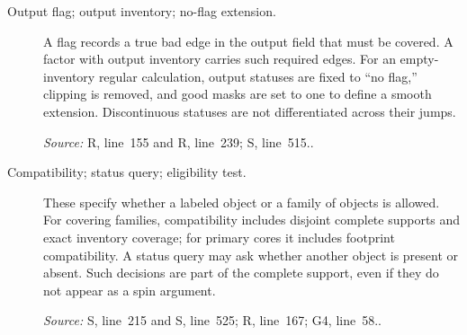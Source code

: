 \documentclass[11pt]{article}
\newcommand{\src}[2]{\textsf{#1}, line~#2}
\newcommand{\where}[1]{\par{\small\textit{Source:} #1.}}
\begin{document}
\begin{description}
\item[Output flag; output inventory; no-flag extension.]
A flag records a true bad edge in the output field that must be
covered.  A factor with output inventory carries such required edges.
For an empty-inventory regular calculation, output statuses are fixed
to ``no flag,'' clipping is removed, and good masks are set to one
to define a smooth extension.  Discontinuous statuses are not
differentiated across their jumps.
\where{\src{R}{155} and \src{R}{239}; \src{S}{515}.}

\item[Compatibility; status query; eligibility test.]
These specify whether a labeled object or a family of objects is
allowed.  For covering families, compatibility includes disjoint
complete supports and exact inventory coverage; for primary cores it
includes footprint compatibility.  A status query may ask whether
another object is present or absent.  Such decisions are part of the
complete support, even if they do not appear as a spin argument.
\where{\src{S}{215} and \src{S}{525}; \src{R}{167}; \src{G4}{58}.}
\end{description}
\end{document}
